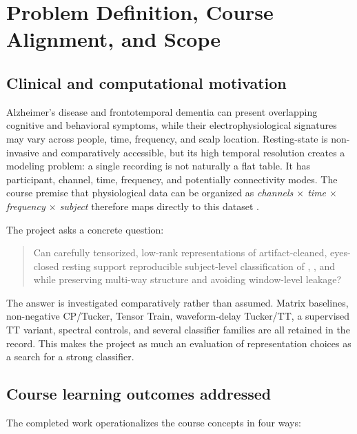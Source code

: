 \chapter{Problem Definition, Course Alignment, and Scope}
\label{ch:scope}

\section{Clinical and computational motivation}

Alzheimer's disease and frontotemporal dementia can present overlapping
cognitive and behavioral symptoms, while their electrophysiological signatures
may vary across people, time, frequency, and scalp location. Resting-state
\EEG{} is non-invasive and comparatively accessible, but its high temporal
resolution creates a modeling problem: a single recording is not naturally a
flat table. It has participant, channel, time, frequency, and potentially
connectivity modes. The course premise that physiological data can be organized
as \emph{channels $\times$ time $\times$ frequency $\times$ subject} therefore
maps directly to this dataset \citep{padhy2026course}.

The project asks a concrete question:

\begin{quote}
Can carefully tensorized, low-rank representations of artifact-cleaned,
eyes-closed resting \EEG{} support reproducible subject-level classification of
\AD{}, \FTD{}, and \CN{} while preserving multi-way structure and avoiding
window-level leakage?
\end{quote}

The answer is investigated comparatively rather than assumed. Matrix baselines,
non-negative CP/Tucker, Tensor Train, waveform-delay Tucker/TT, a supervised TT
variant, spectral controls, and several classifier families are all retained in
the record. This makes the project as much an evaluation of representation
choices as a search for a strong classifier.

\section{Course learning outcomes addressed}

The completed work operationalizes the course concepts in four ways:

